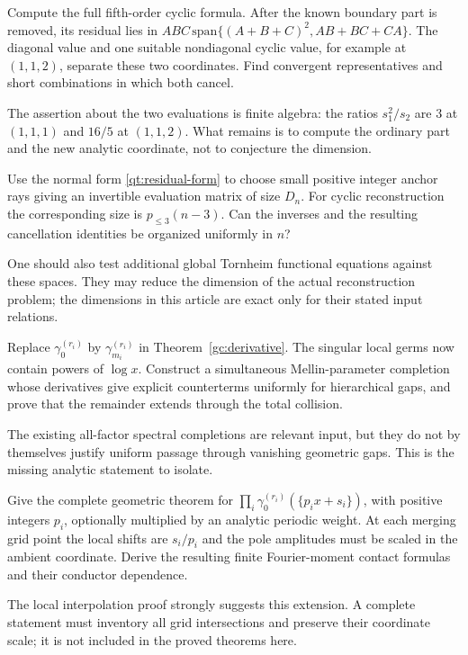 \begin{question}
Compute the full fifth-order cyclic formula. After the known boundary
part is removed, its residual lies in
$ABC\,\mathrm{span}\{(A+B+C)^2,AB+BC+CA\}$.
The diagonal value and one suitable nondiagonal cyclic value, for example
at $(1,1,2)$, separate these two coordinates. Find convergent
representatives and short combinations in which both cancel.
\end{question}
The assertion about the two evaluations is finite algebra: the ratios
$s_1^2/s_2$ are $3$ at $(1,1,1)$ and $16/5$ at $(1,1,2)$.
What remains is to compute the ordinary part and the new analytic
coordinate, not to conjecture the dimension.

\begin{question}
Use the normal form \eqref{qt:residual-form} to choose small positive
integer anchor rays giving an invertible evaluation matrix of size
$D_n$. For cyclic reconstruction the corresponding size is
$p_{\le3}(n-3)$. Can the inverses and the resulting cancellation
identities be organized uniformly in $n$?
\end{question}
One should also test additional global Tornheim functional equations
against these spaces. They may reduce the dimension of the actual
reconstruction problem; the dimensions in this article are exact only
for their stated input relations.

\begin{question}
Replace $\gamma_0^{(r_i)}$ by $\gamma_{m_i}^{(r_i)}$ in
Theorem~\ref{gc:derivative}. The singular local germs now contain
powers of $\log x$. Construct a simultaneous Mellin-parameter
completion whose derivatives give explicit counterterms uniformly for
hierarchical gaps, and prove that the remainder extends through the
total collision.
\end{question}
The existing all-factor spectral completions are relevant input, but
they do not by themselves justify uniform passage through vanishing
geometric gaps. This is the missing analytic statement to isolate.

\begin{question}
Give the complete geometric theorem for
$\prod_i\gamma_0^{(r_i)}(\{p_i x+s_i\})$, with positive integers
$p_i$, optionally multiplied by an analytic periodic weight. At each
merging grid point the local shifts are $s_i/p_i$ and the pole amplitudes
must be scaled in the ambient coordinate. Derive the resulting finite
Fourier-moment contact formulas and their conductor dependence.
\end{question}
The local interpolation proof strongly suggests this extension. A
complete statement must inventory all grid intersections and preserve
their coordinate scale; it is not included in the proved theorems here.

